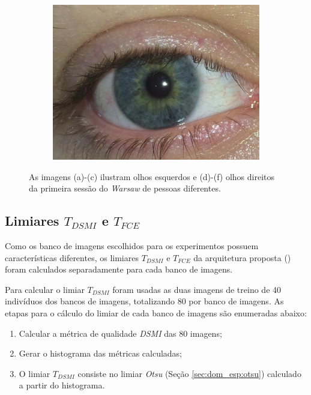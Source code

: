 \begin{figure}[H]
\begin{subfigure}{0.25\textwidth}
  \includegraphics[width=\linewidth]{img/Resultados/warsaw/right_68.jpg}
  \caption{}
\end{subfigure}
\caption{As imagens (a)-(c) ilustram olhos esquerdos e (d)-(f) olhos direitos da primeira sessão do \textit{\acrshort{Warsaw}} de pessoas diferentes.}
\label{fig:experimentos:warsaw_1}
\end{figure}

\FloatBarrier

\subsection{Limiares $T_{DSMI}$ e $T_{FCE}$} \label{sec:experimentos:db:limiares}

\par Como os banco de imagens escolhidos para os experimentos possuem características diferentes, os limiares $T_{DSMI}$ e $T_{FCE}$ da arquitetura proposta () foram calculados separadamente para cada banco de imagens.

\par Para calcular o limiar $T_{DSMI}$ foram usadas as duas imagens de treino de 40 indivíduos dos bancos de imagens, totalizando 80 por banco de imagens. As etapas para o cálculo do limiar de cada banco de imagens são enumeradas abaixo:

\begin{enumerate}
    \item Calcular a métrica de qualidade \textit{\acrshort{DSMI}} das 80 imagens;
    \item Gerar o histograma das métricas calculadas;
    \item O limiar $T_{DSMI}$ consiste no limiar \textit{Otsu} (Seção \ref{sec:dom_esp:otsu}) calculado a partir do histograma.
\end{enumerate}

